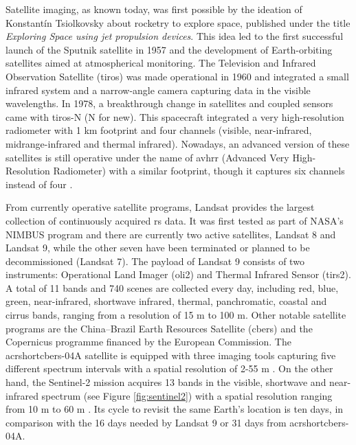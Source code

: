 Satellite imaging, as known today, was first possible by the ideation of Konstantín Tsiolkovsky about rocketry to explore space, published under the title \textit{Exploring Space using jet propulsion devices}. This idea led to the first successful launch of the Sputnik satellite in 1957 and the development of Earth-orbiting satellites aimed at atmospherical monitoring. The Television and Infrared Observation Satellite (\acrshort{tiros}) was made operational in 1960 and integrated a small infrared system and a narrow-angle camera capturing data in the visible wavelengths. In 1978, a breakthrough change in satellites and coupled sensors came with \acrshort{tiros}-N (N for new). This spacecraft integrated a very high-resolution radiometer with 1 \si{\kilo\meter} footprint and four channels (visible, near-infrared, midrange-infrared and thermal infrared). Nowadays, an advanced version of these satellites is still operative under the name of \acrshort{avhrr} (Advanced Very High-Resolution Radiometer) with a similar footprint, though it captures six channels instead of four \cite{national_oceanic_and_atmospheric_administration_avhrr3_nodate}.   

From currently operative satellite programs, Landsat provides the largest collection of continuously acquired \acrshort{rs} data. It was first tested as part of NASA's NIMBUS program and there are currently two active satellites, Landsat 8 and Landsat 9, while the other seven have been terminated or planned to be decommissioned (Landsat 7). The payload of Landsat 9 consists of two instruments: Operational Land Imager (\acrshort{oli2}) and Thermal Infrared Sensor (\acrshort{tirs2}). A total of 11 bands and 740 scenes are collected every day, including red, blue, green, near-infrared, shortwave infrared, thermal, panchromatic, coastal and cirrus bands, ranging from a resolution of 15 \si{\meter} to 100 \si{\meter}. Other notable satellite programs are the China–Brazil Earth Resources Satellite (\acrshort{cbers}) and the Copernicus programme financed by the European Commission. The acrshort{cbers}-04A satellite is equipped with three imaging tools capturing five different spectrum intervals with a spatial resolution of 2-55 \si{\meter} \cite{instituto_nacional_de_pesquisas_espaciais_inpecbers_2019}. On the other hand, the Sentinel-2 mission acquires 13 bands in the visible, shortwave and near-infrared spectrum (see Figure \ref{fig:sentinel2}) with a spatial resolution ranging from 10 \si{\meter} to 60 \si{\meter} \cite{european_environment_agency_eu_2017}. Its cycle to revisit the same Earth's location is ten days, in comparison with the 16 days needed by Landsat 9 or 31 days from acrshort{cbers}-04A.

